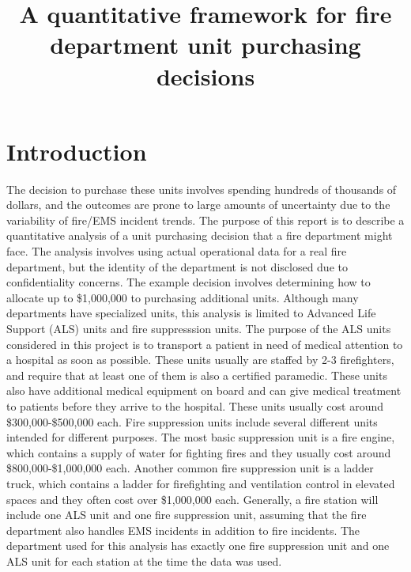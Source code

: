 \documentclass[article]{proc}
\begin{document}
\title{A quantitative framework for fire department unit purchasing decisions}
\address[1]{The University of Texas at Austin, Austin, TX, 78712, USA}

\maketitle



\section{Introduction}
The decision to purchase these units involves spending hundreds of thousands of dollars, and the outcomes are prone to large amounts of uncertainty due to the variability of fire/EMS incident trends. The purpose of this report is to describe a quantitative analysis of a unit purchasing decision that a fire department might face. The analysis involves using actual operational data for a real fire department, but the identity of the department is not disclosed due to confidentiality concerns. The example decision involves determining how to allocate up to \$1,000,000 to purchasing additional units. Although many departments have specialized units, this analysis is limited to Advanced Life Support (ALS) units and fire suppresssion units. The purpose of the ALS units considered in this project is to transport a patient in need of medical attention to a hospital as soon as possible. These units usually are staffed by 2-3 firefighters, and require that at least one of them is also a certified paramedic. These units also have additional medical equipment on board and can give medical treatment to patients before they arrive to the hospital. These units usually cost around \$300,000-\$500,000 each. Fire suppression units include several different units intended for different purposes. The most basic suppression unit is a fire engine, which contains a supply of water for fighting fires and they usually cost around \$800,000-\$1,000,000 each. Another common fire suppression unit is a ladder truck, which contains a ladder for firefighting and ventilation control in elevated spaces and they often cost over \$1,000,000 each. Generally, a fire station will include one ALS unit and one fire suppression unit, assuming that the fire department also handles EMS incidents in addition to fire incidents. The department used for this analysis has exactly one fire suppression unit and one ALS unit for each station at the time the data was used. 
\end{document}
